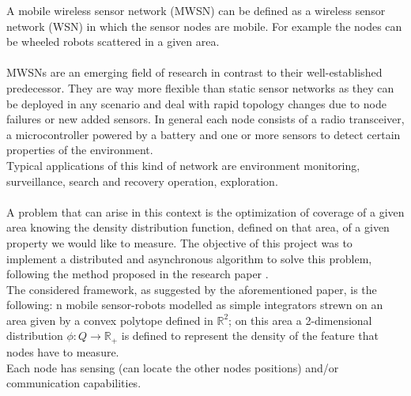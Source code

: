 \documentclass[a4paper,11pt,oneside]{book}
\begin{document}
	 A mobile wireless sensor network (MWSN) can be defined as a wireless sensor network (WSN) in which the sensor nodes are mobile. For example the nodes can be wheeled robots scattered in a given area.\\\\
	
	MWSNs are an emerging field of research in contrast to their well-established predecessor. They are way more flexible than static sensor networks as they can be deployed in any scenario and deal with rapid topology changes due to node failures or new added sensors. In general each node consists of a radio transceiver, a microcontroller powered by a battery and one or more sensors to detect certain properties of the environment.~\cite{K2}\\ 
	Typical applications of this kind of network are environment monitoring, surveillance, search and recovery operation, exploration.\\\\
	
	A problem that can arise in this context is the optimization of coverage of a given area knowing the density distribution function, defined on that area, of a given property we would like to measure. The objective of this project was to implement a distributed and asynchronous algorithm to solve this problem, following the method proposed in the research paper \cite{K1}.\\
	
	The considered framework, as suggested by the aforementioned paper, is the following: n mobile sensor-robots modelled as simple integrators strewn on an area given by a convex polytope defined in $\mathbb{R}^2$; on this area a 2-dimensional distribution $\phi:Q\rightarrow \mathbb{R}_+$ is defined to represent the density of the feature that nodes have to measure.\\ Each node has sensing (can locate the other nodes positions) and/or communication capabilities.  \\
	
\end{document}
